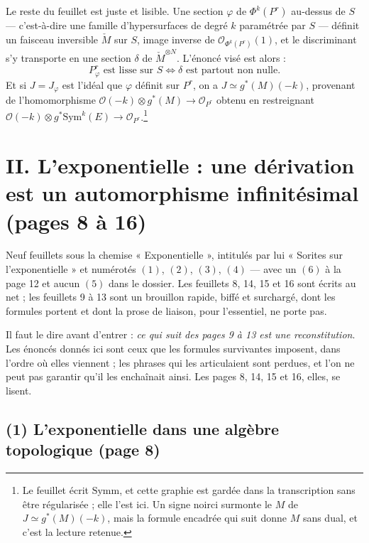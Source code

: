 \documentclass[11pt,a4paper]{article}
\begin{document}
Le reste du feuillet est juste et lisible. Une section $\varphi$ de
$\Phi^{k}(P^{r})$ au-dessus de $S$ — c'est-à-dire une famille d'hypersurfaces
de degré $k$ paramétrée par $S$ — définit un faisceau inversible $\check{M}$ sur
$S$, image inverse de $\mathcal{O}_{\Phi^{k}(P^{r})}(1)$, et le discriminant
s'y transporte en une section $\delta$ de $\check{M}^{\otimes N}$. L'énoncé
visé est alors :
\[
  P^{r}_{\varphi} \text{ est lisse sur } S
  \iff \delta \text{ est partout non nulle.}
\]
Et si $J = J_{\varphi}$ est l'idéal que $\varphi$ définit sur $P^{r}$, on a
$J \simeq g^{*}(M)(-k)$, provenant de l'homomorphisme $\mathcal{O}(-k) \otimes
g^{*}(M) \to \mathcal{O}_{P^{r}}$ obtenu en restreignant
$\mathcal{O}(-k) \otimes g^{*}\mathrm{Sym}^{k}(E) \to
\mathcal{O}_{P^{r}}$.\footnote{Le feuillet écrit $\mathrm{Symm}$, et cette
graphie est gardée dans la transcription sans être régularisée ; elle l'est
ici. Un signe noirci surmonte le $M$ de $J \simeq g^{*}(M)(-k)$, mais la
formule encadrée qui suit donne $M$ sans dual, et c'est la lecture retenue.}

\section*{II. L'exponentielle : une dérivation est un automorphisme infinitésimal (pages 8 à 16)}

Neuf feuillets sous la chemise « Exponentielle », intitulés par lui
« Sorites sur l'exponentielle » et numérotés $(1)$, $(2)$, $(3)$, $(4)$ — avec
un $(6)$ à la page 12 et aucun $(5)$ dans le dossier. Les feuillets 8, 14, 15 et
16 sont écrits au net ; les feuillets 9 à 13 sont un brouillon rapide, biffé et
surchargé, dont les formules portent et dont la prose de liaison, pour
l'essentiel, ne porte pas.

Il faut le dire avant d'entrer : \emph{ce qui suit des pages 9 à 13 est une
reconstitution}. Les énoncés donnés ici sont ceux que les formules survivantes
imposent, dans l'ordre où elles viennent ; les phrases qui les articulaient
sont perdues, et l'on ne peut pas garantir qu'il les enchaînait ainsi. Les
pages 8, 14, 15 et 16, elles, se lisent.

\subsection*{(1) L'exponentielle dans une algèbre topologique (page 8)}
\end{document}
